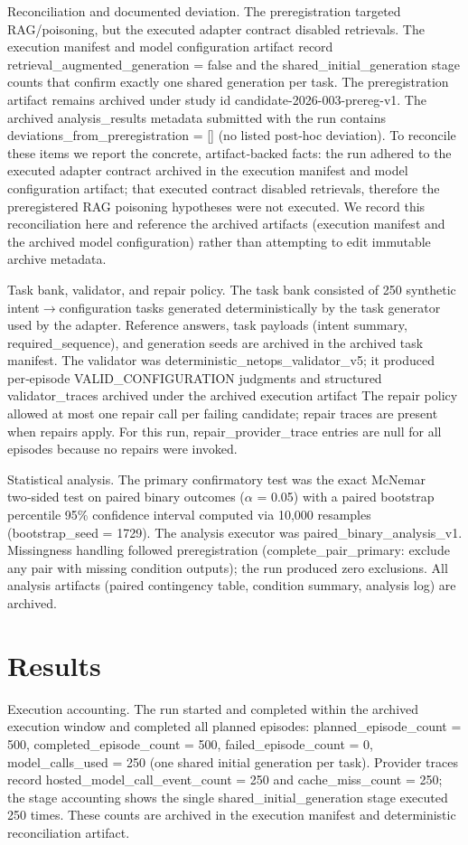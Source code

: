 \documentclass[conference]{IEEEtran}
\begin{document}
Reconciliation and documented deviation. The preregistration targeted RAG/poisoning, but the executed adapter contract disabled retrievals. The execution manifest and model configuration artifact record retrieval\_augmented\_generation = false and the shared\_initial\_generation stage counts that confirm exactly one shared generation per task. The preregistration artifact remains archived under study id candidate-2026-003-prereg-v1. The archived analysis\_results metadata submitted with the run contains deviations\_from\_preregistration = [] (no listed post‑hoc deviation). To reconcile these items we report the concrete, artifact‑backed facts: the run adhered to the executed adapter contract archived in the execution manifest and model configuration artifact; that executed contract disabled retrievals, therefore the preregistered RAG poisoning hypotheses were not executed. We record this reconciliation here and reference the archived artifacts (execution manifest and the archived model configuration) rather than attempting to edit immutable archive metadata.

Task bank, validator, and repair policy. The task bank consisted of 250 synthetic intent\ensuremath{\rightarrow}configuration tasks generated deterministically by the task generator used by the adapter. Reference answers, task payloads (intent summary, required\_sequence), and generation seeds are archived in the archived task manifest. The validator was deterministic\_netops\_validator\_v5; it produced per‑episode VALID\_CONFIGURATION judgments and structured validator\_traces archived under the archived execution artifact The repair policy allowed at most one repair call per failing candidate; repair traces are present when repairs apply. For this run, repair\_provider\_trace entries are null for all episodes because no repairs were invoked.

Statistical analysis. The primary confirmatory test was the exact McNemar two‑sided test on paired binary outcomes (\ensuremath{\alpha} = 0.05) with a paired bootstrap percentile 95\% confidence interval computed via 10,000 resamples (bootstrap\_seed = 1729). The analysis executor was paired\_binary\_analysis\_v1. Missingness handling followed preregistration (complete\_pair\_primary: exclude any pair with missing condition outputs); the run produced zero exclusions. All analysis artifacts (paired contingency table, condition summary, analysis log) are archived.

\section{Results}
Execution accounting. The run started and completed within the archived execution window and completed all planned episodes: planned\_episode\_count = 500, completed\_episode\_count = 500, failed\_episode\_count = 0, model\_calls\_used = 250 (one shared initial generation per task). Provider traces record hosted\_model\_call\_event\_count = 250 and cache\_miss\_count = 250; the stage accounting shows the single shared\_initial\_generation stage executed 250 times. These counts are archived in the execution manifest and deterministic reconciliation artifact.
\end{document}

